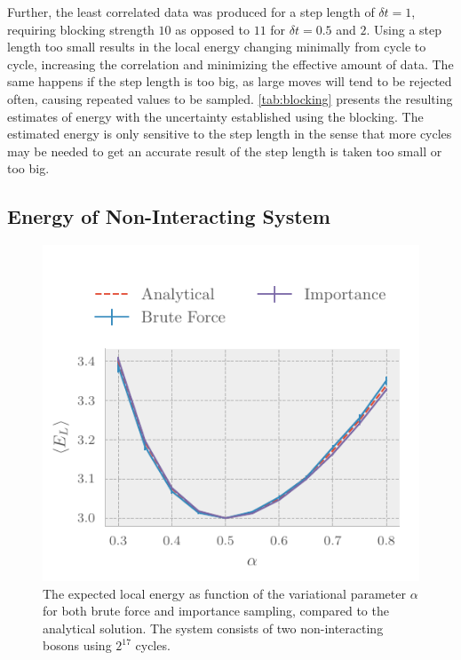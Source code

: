Further, the least correlated data was produced for a step length of $\delta t = 1$,
requiring blocking strength $10$ as opposed to $11$ for $\delta t = 0.5$ and
$2$. Using a step length too small results in the local energy changing
minimally from cycle to cycle, increasing the correlation and minimizing the
effective amount of data. The same happens if the step length is too big, as
large moves will tend to be rejected often, causing repeated values to be
sampled. \autoref{tab:blocking} presents the resulting estimates of energy with
the uncertainty established using the blocking. The estimated
energy is only sensitive to the step length in the sense that more cycles may be
needed to get an accurate result of the step length is taken too small or too
big.

 
\subsection{Energy of Non-Interacting System}
\begin{figure}[ht]
  \centering
  \includegraphics[]{figures/energy_importance1.pdf}
  \caption{\label{fig:energybyalpha} The expected local energy as function of
    the variational parameter \(\alpha\) for both brute force and importance
    sampling, compared to the analytical solution. The system consists of two
    non-interacting bosons using \(2^{17}\) cycles.}
\end{figure}
